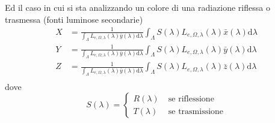 Ed il caso in cui si sta analizzando un colore di una radiazione riflessa o trasmessa (fonti luminose secondarie)
\begin{align}
	X &= \frac{1}{\int_\Lambda L_{e,\Omega,\lambda}(\lambda)\bar{y}(\lambda)\mathrm{d}\lambda}
		\int_\Lambda S(\lambda)L_{e,\Omega,\lambda}(\lambda)\bar{x}(\lambda)\mathrm{d}\lambda\\
	Y &= \frac{1}{\int_\Lambda L_{e,\Omega,\lambda}(\lambda)\bar{y}(\lambda)\mathrm{d}\lambda}
		\int_\Lambda S(\lambda)L_{e,\Omega,\lambda}(\lambda)\bar{y}(\lambda)\mathrm{d}\lambda\\
	Z &= \frac{1}{\int_\Lambda L_{e,\Omega,\lambda}(\lambda)\bar{y}(\lambda)\mathrm{d}\lambda}
		\int_\Lambda S(\lambda)L_{e,\Omega,\lambda}(\lambda)\bar{z}(\lambda)\mathrm{d}\lambda\\
\end{align}
dove
\begin{equation}\label{chapter2:colorimetry:spectrum2XYZ4Rad}
	S(\lambda) = \left\{ \begin{aligned}
		R(\lambda)\;&\text{se riflessione}\\
		T(\lambda)\;&\text{se trasmissione}
	\end{aligned}\right.
\end{equation}
